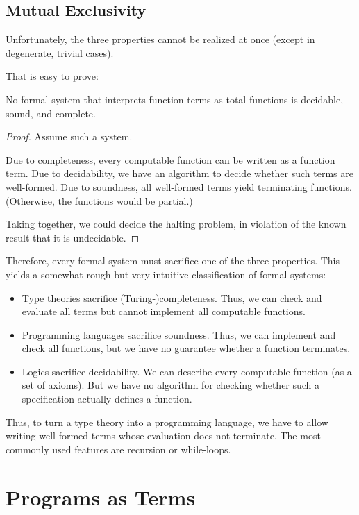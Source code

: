 \subsection{Mutual Exclusivity}

Unfortunately, the three properties cannot be realized at once (except in degenerate, trivial cases).

That is easy to prove:
\begin{theorem}
No formal system that interprets function terms as total functions is decidable, sound, and complete.
\end{theorem}
\begin{proof}
Assume such a system.

Due to completeness, every computable function can be written as a function term.
Due to decidability, we have an algorithm to decide whether such terms are well-formed.
Due to soundness, all well-formed terms yield terminating functions. (Otherwise, the functions would be partial.)

Taking together, we could decide the halting problem, in violation of the known result that it is undecidable.
\end{proof}

Therefore, every formal system must sacrifice one of the three properties.
This yields a somewhat rough but very intuitive classification of formal systems:
\begin{itemize}
 \item Type theories sacrifice (Turing-)completeness. Thus, we can check and evaluate all terms but cannot implement all computable functions.
 \item Programming languages sacrifice soundness. Thus, we can implement and check all functions, but we have no guarantee whether a function terminates.
 \item Logics sacrifice decidability. We can describe every computable function (as a set of axioms). But we have no algorithm for checking whether such a specification actually defines a function.
\end{itemize}

Thus, to turn a type theory into a programming language, we have to allow writing well-formed terms whose evaluation does not terminate.
The most commonly used features are recursion or while-loops.

\section{Programs as Terms}

